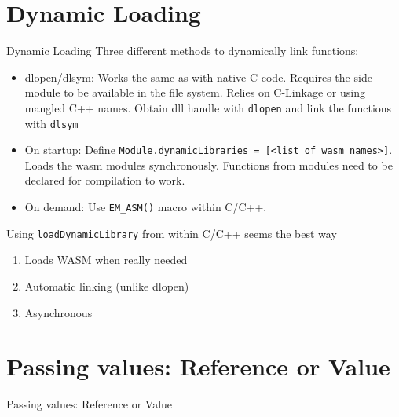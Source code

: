\documentclass[10pt, a4paper]{beamer} %
\begin{document}
\section{Dynamic Loading}
\begin{frame}[allowframebreaks]{Dynamic Loading}
  Three different methods to dynamically link functions:

  \begin{itemize}
    \item dlopen/dlsym: Works the same as with native C code. Requires the side module to be available in the file system. Relies on C-Linkage or using mangled
    C++ names. Obtain dll handle with \texttt{dlopen} and link the functions with \texttt{dlsym}
    \item On startup: Define \texttt{Module.dynamicLibraries = [<list of wasm names>]}. Loads the wasm modules synchronously. Functions from modules need 
    to be declared for compilation to work.
    \item On demand: Use \texttt{EM\_ASM()} macro within C/C++.
  \end{itemize}
  \framebreak

    Using \texttt{loadDynamicLibrary} from within C/C++ seems the best way

    \begin{enumerate}
      \item Loads WASM when really needed
      \item Automatic linking (unlike dlopen)
      \item Asynchronous
    \end{enumerate}
\end{frame}

\section{Passing values: Reference or Value}
\begin{frame}{Passing values: Reference or Value}

\end{frame}

\section{}
\end{document}
